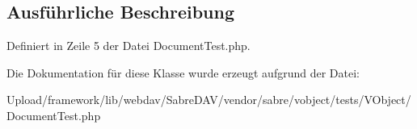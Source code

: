 \subsection{Ausführliche Beschreibung}


Definiert in Zeile 5 der Datei Document\+Test.\+php.



Die Dokumentation für diese Klasse wurde erzeugt aufgrund der Datei\+:\begin{DoxyCompactItemize}
\item 
Upload/framework/lib/webdav/\+Sabre\+D\+A\+V/vendor/sabre/vobject/tests/\+V\+Object/Document\+Test.\+php\end{DoxyCompactItemize}
